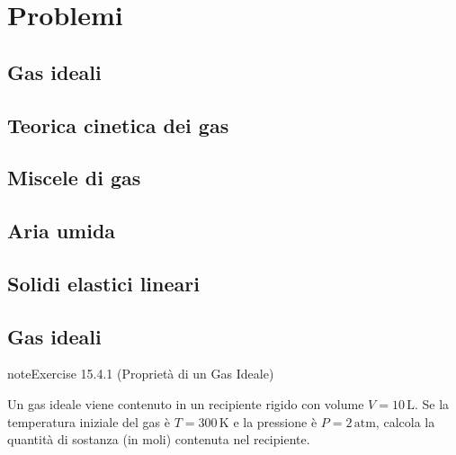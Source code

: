 \documentclass[letterpaper,10pt,italian]{jupyterBook}
\begin{document}
\sphinxstepscope


\section{Problemi}
\label{\detokenize{ch/thermodynamics/matter-problems:problemi}}\label{\detokenize{ch/thermodynamics/matter-problems:physics-hs-thermodynamics-matter-problems}}\label{\detokenize{ch/thermodynamics/matter-problems::doc}}

\subsection{Gas ideali}
\label{\detokenize{ch/thermodynamics/matter-problems:gas-ideali}}

\subsection{Teorica cinetica dei gas}
\label{\detokenize{ch/thermodynamics/matter-problems:teorica-cinetica-dei-gas}}

\subsection{Miscele di gas}
\label{\detokenize{ch/thermodynamics/matter-problems:miscele-di-gas}}

\subsection{Aria umida}
\label{\detokenize{ch/thermodynamics/matter-problems:aria-umida}}

\subsection{Solidi elastici lineari}
\label{\detokenize{ch/thermodynamics/matter-problems:solidi-elastici-lineari}}

\subsection{Gas ideali}
\label{\detokenize{ch/thermodynamics/matter-problems:id1}} \label{exercise:ch/thermodynamics/matter-problems-exercise-0}

\begin{sphinxadmonition}{note}{Exercise 15.4.1 (Proprietà di un Gas Ideale)}



\sphinxAtStartPar
Un gas ideale viene contenuto in un recipiente rigido con volume \(V = 10 \, \text{L}\). Se la temperatura iniziale del gas è \(T = 300 \, \text{K}\) e la pressione è \(P = 2 \, \text{atm}\), calcola la quantità di sostanza (in moli) contenuta nel recipiente.
\end{sphinxadmonition}
 \label{exercise:ch/thermodynamics/matter-problems-exercise-1}
\end{document}
